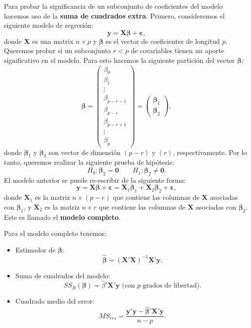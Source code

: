 \documentclass[
]{article}
\providecommand{\tightlist}{%
  \setlength{\itemsep}{0pt}\setlength{\parskip}{0pt}}
\begin{document}
Para probar la significancia de un subconjunto de coeficientes del modelo hacemos uso de la \textbf{suma de cuadrados extra}. Primero, consideremos el siguiente modelo de regresión:
\[
\boldsymbol y= \boldsymbol X\boldsymbol \beta+ \boldsymbol \varepsilon,
\]
donde \(\boldsymbol X\) es una matrix \(n \times p\) y \(\boldsymbol \beta\) es el vector de coeficientes de longitud \(p\). Queremos probar si un subconjunto \(r < p\) de covariables tienen un aporte significativo en el modelo. Para esto hacemos la siguiente partición del vector \(\boldsymbol \beta\):
\[
\boldsymbol \beta= \begin{pmatrix} \beta_{0} \\ \beta_{1} \\ \vdots \\ \beta_{p-r-1} \\ \hline \beta_{p-r} \\ \beta_{p-r+1} \\ \vdots \\  \beta_{p} \end{pmatrix} =  \begin{pmatrix} \boldsymbol \beta_{1} \\ \hline \boldsymbol \beta_{2}\end{pmatrix},
\]
donde \(\boldsymbol \beta_{1}\) y \(\boldsymbol \beta_{2}\) son vector de dimensión \((p-r)\) y \((r)\), respectivamente. Por lo tanto, queremos realizar la siguiente prueba de hipótesis:
\begin{equation}
H_{0}:  \boldsymbol \beta_{2} = \boldsymbol 0\qquad H_{1}:  \boldsymbol \beta_{2} \neq \boldsymbol 0.
\label{eq:Hsubset}
\end{equation}
El modelo anterior se puede re-escribir de la siguiente forma:
\[
\boldsymbol y= \boldsymbol X\boldsymbol \beta+ \boldsymbol \varepsilon= \boldsymbol X_{1}\boldsymbol \beta_{1}+ \boldsymbol X_{2}\boldsymbol \beta_{2} + \boldsymbol \varepsilon,
\]
donde \(\boldsymbol X_{1}\) es la matriz \(n\times (p-r)\) que contiene las columnas de \(\boldsymbol X\) asociadas con \(\boldsymbol \beta_{1}\), y \(\boldsymbol X_{2}\) es la matriz \(n\times r\) que contiene las columnas de \(\boldsymbol X\) asociadas con \(\boldsymbol \beta_{2}\). Este es llamado el \textbf{modelo completo}.

Para el modelo completo tenemos:

\begin{itemize}
\tightlist
\item
  Estimador de \(\boldsymbol \beta\):
  \[
  \widehat{\boldsymbol \beta}= (\boldsymbol X'\boldsymbol X)^{-1}\boldsymbol X'\boldsymbol y.
  \]
\item
  Suma de cuadrados del modelo:
  \[
  SS_{R}(\boldsymbol \beta) = \widehat{\beta}'\boldsymbol X'\boldsymbol y\mbox{ (con }p\mbox{ grados de libertad)}.
  \]
\item
  Cuadrado medio del error:
  \[
  MS_{res} = \frac{\boldsymbol y'\boldsymbol y- \widehat{\boldsymbol \beta}'\boldsymbol X'\boldsymbol y}{n-p}.
  \]
\end{itemize}
\end{document}
